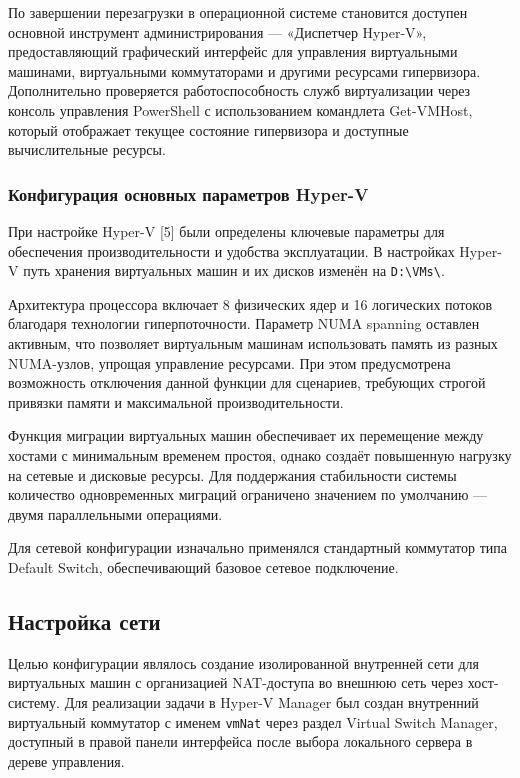 \documentclass[areaset=advanced]{scrartcl}
\begin{document}
По завершении перезагрузки в операционной системе становится доступен основной инструмент администрирования — «Диспетчер Hyper-V», предоставляющий графический интерфейс для управления виртуальными машинами, виртуальными коммутаторами и другими ресурсами гипервизора. Дополнительно проверяется работоспособность служб виртуализации через консоль управления PowerShell с использованием командлета Get-VMHost, который отображает текущее состояние гипервизора и доступные вычислительные ресурсы.

\subsubsection{Конфигурация основных параметров Hyper-V}
При настройке Hyper-V [5] были определены ключевые параметры для обеспечения производительности и удобства эксплуатации. В настройках Hyper-V путь хранения виртуальных машин и их дисков изменён на \texttt{D:\textbackslash VMs\textbackslash}.

Архитектура процессора включает 8 физических ядер и 16 логических потоков благодаря технологии гиперпоточности. Параметр NUMA spanning оставлен активным, что позволяет виртуальным машинам использовать память из разных NUMA-узлов, упрощая управление ресурсами. При этом предусмотрена возможность отключения данной функции для сценариев, требующих строгой привязки памяти и максимальной производительности.

Функция миграции виртуальных машин обеспечивает их перемещение между хостами с минимальным временем простоя, однако создаёт повышенную нагрузку на сетевые и дисковые ресурсы. Для поддержания стабильности системы количество одновременных миграций ограничено значением по умолчанию — двумя параллельными операциями.

Для сетевой конфигурации изначально применялся стандартный коммутатор типа Default Switch, обеспечивающий базовое сетевое подключение.

\subsection{Настройка сети}
Целью конфигурации являлось создание изолированной внутренней сети для виртуальных машин с организацией NAT-доступа во внешнюю сеть через хост-систему. Для реализации задачи в Hyper-V Manager был создан внутренний виртуальный коммутатор с именем \texttt{vmNat} через раздел Virtual Switch Manager, доступный в правой панели интерфейса после выбора локального сервера в дереве управления.
\end{document}
